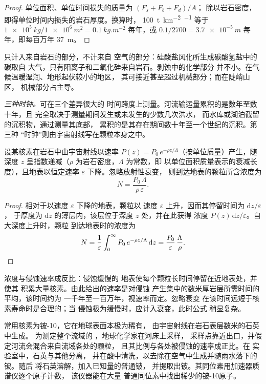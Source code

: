 \begin{proof}
单位面积、单位时间损失的质量为 $(F_s + F_b + F_d)/A$；
除以岩石密度，即得单位时间内损失的岩石厚度。换算时，
\qty{100}{t.km^{-2}.^{-1}} 等于
$\qty{1e5}{kg}/\qty{1e6}{m^2} = \qty{0.1}{kg.m^{-2}}$ 每年，或
$0.1/2700 = \qty{3.7e-5}{m}$ 每年，即每百万年 \qty{37}{m}。
\end{proof}

只计入来自岩石的部分，不计来自
空气的部分：硅酸盐风化所生成碳酸氢盐中的碳取自
大气，只有阳离子和二氧化硅来自岩石。剥蚀中的化学部分
并不小。在气候温暖湿润、地形起伏较小的地区，
其可接近甚至超过机械部分；而在陡峭山区，
机械部分占主导。

\emph{三种时钟。}可在三个差异很大的
时间跨度上测量。河流输运量累积的是数年至数十年，且
完全取决于测量期间发生或未发生的少数几次洪水，
而水库或湖泊截留的沉积物，通过测量其底部，
累积的是其存在期间数十年至一个世纪的沉积。第三种
“时钟”则由宇宙射线写在颗粒本身之中。

\begin{proposition}[宇宙成因核素与侵蚀]\label{prop:b1:erosion-transport:cosmogenic}
设某核素在岩石中由宇宙射线以速率
$P(z) = P_0\,e^{-\rho z/\Lambda}$（按单位质量）产生，随
深度 $z$ 呈指数递减（$\rho$ 为岩石密度，$\Lambda$ 为常数，即
以单位面积质量表示的衰减长度），且地表以恒定速率 $\varepsilon$
下降。忽略放射性衰变，
则到达地表的颗粒所含浓度为
\[
  N = \frac{P_0\,\Lambda}{\rho\,\varepsilon}.
\]
\end{proposition}

\begin{proof}
相对于以速度 $\varepsilon$ 下降的地表，颗粒以
速度 $\varepsilon$ 上升，因而其停留时间为 $\mathrm dz/\varepsilon$，
于厚度为 $\mathrm dz$ 的薄层内，该层位于深度 $z$ 处，并在此获得
浓度 $P(z)\,\mathrm dz/\varepsilon$。自大深度上升时，颗粒
到达地表时的浓度为
\[
  N = \frac{1}{\varepsilon}\int_0^{\infty} P_0\,e^{-\rho z/\Lambda}\,\mathrm dz
  = \frac{P_0}{\varepsilon}\,\frac{\Lambda}{\rho}. \qedhere
\]
\end{proof}

浓度与侵蚀速率成反比：侵蚀缓慢的
地表使每个颗粒长时间停留在近地表处，并使其
积累大量核素。由此给出的速率是对侵蚀
产生集中的数米厚岩层所需时间的平均，该时间约为
一千年至一百万年，视速率而定。忽略衰变
在该时间远短于核素寿命时是合理的；当
侵蚀极为缓慢时，应计入衰变，此时公式
稍显复杂。

\begin{inthelab}[河砂中的铍-10]
常用核素为铍-10，它在地球表面本极为稀有，
由宇宙射线在岩石表层数米的石英中生成。
为测定整个流域的
，地球化学家在河床上采样，
采样点靠近出口，并假定河流会混合来自流域各处的颗粒，
且其比例与各处被侵蚀的速率成正比。在
实验室中，石英与其他分离，
并在酸中清洗，以去除在空气中生成并随雨水落下的铍。随后
将石英溶解，加入已知量的普通铍，
并提取出铍。其同位素用加速器质谱仪逐个原子计数，
该仪器能在大量
普通同位素中找出稀少的铍-10原子。
\end{inthelab}

